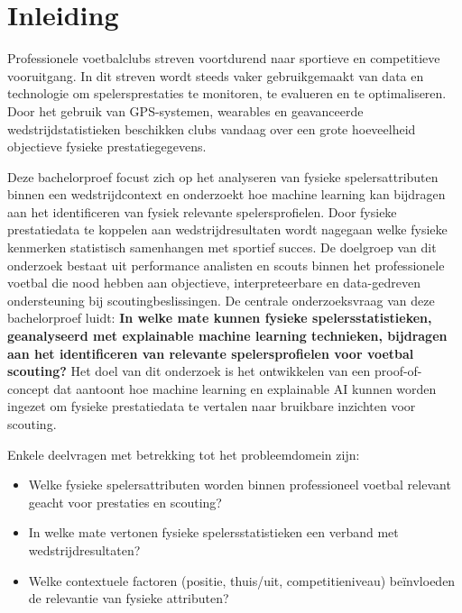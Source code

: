 

\section{Inleiding}%
\label{sec:inleiding}

Professionele voetbalclubs streven voortdurend naar sportieve en competitieve vooruitgang. 
In dit streven wordt steeds vaker gebruikgemaakt van data en technologie om spelersprestaties te monitoren, te evalueren en te optimaliseren. 
Door het gebruik van GPS-systemen, wearables en geavanceerde wedstrijdstatistieken beschikken clubs vandaag over een grote hoeveelheid objectieve fysieke prestatiegegevens.

Deze bachelorproef focust zich op het analyseren van fysieke spelersattributen binnen een wedstrijdcontext en onderzoekt hoe machine learning kan bijdragen aan het identificeren van fysiek relevante spelersprofielen. 
Door fysieke prestatiedata te koppelen aan wedstrijdresultaten wordt nagegaan welke fysieke kenmerken statistisch samenhangen met sportief succes. 
De doelgroep van dit onderzoek bestaat uit performance analisten en scouts binnen het professionele voetbal die nood hebben aan objectieve, interpreteerbare en data-gedreven ondersteuning bij scoutingbeslissingen.
\newline\newline
De centrale onderzoeksvraag van deze bachelorproef luidt: \textbf{In welke mate kunnen fysieke spelersstatistieken, geanalyseerd met explainable machine learning technieken, bijdragen aan het identificeren van relevante spelersprofielen voor voetbal scouting?}
\newline
Het doel van dit onderzoek is het ontwikkelen van een proof-of-concept dat aantoont hoe machine learning en explainable AI kunnen worden ingezet om fysieke prestatiedata te vertalen naar bruikbare inzichten voor scouting.

Enkele deelvragen met betrekking tot het probleemdomein zijn: 
\begin{itemize}
    \item Welke fysieke spelersattributen worden binnen professioneel voetbal relevant geacht voor prestaties en scouting?
    \item In welke mate vertonen fysieke spelersstatistieken een verband met wedstrijdresultaten?
    \item Welke contextuele factoren (positie, thuis/uit, competitieniveau) beïnvloeden de relevantie van fysieke attributen?
\end{itemize}

